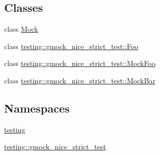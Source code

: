 \subsection*{Classes}
\begin{DoxyCompactItemize}
\item 
class \hyperlink{class_mock}{Mock}
\item 
class \hyperlink{classtesting_1_1gmock__nice__strict__test_1_1_foo}{testing\+::gmock\+\_\+nice\+\_\+strict\+\_\+test\+::\+Foo}
\item 
class \hyperlink{classtesting_1_1gmock__nice__strict__test_1_1_mock_foo}{testing\+::gmock\+\_\+nice\+\_\+strict\+\_\+test\+::\+Mock\+Foo}
\item 
class \hyperlink{classtesting_1_1gmock__nice__strict__test_1_1_mock_bar}{testing\+::gmock\+\_\+nice\+\_\+strict\+\_\+test\+::\+Mock\+Bar}
\end{DoxyCompactItemize}
\subsection*{Namespaces}
\begin{DoxyCompactItemize}
\item 
 \hyperlink{namespacetesting}{testing}
\item 
 \hyperlink{namespacetesting_1_1gmock__nice__strict__test}{testing\+::gmock\+\_\+nice\+\_\+strict\+\_\+test}
\end{DoxyCompactItemize}
